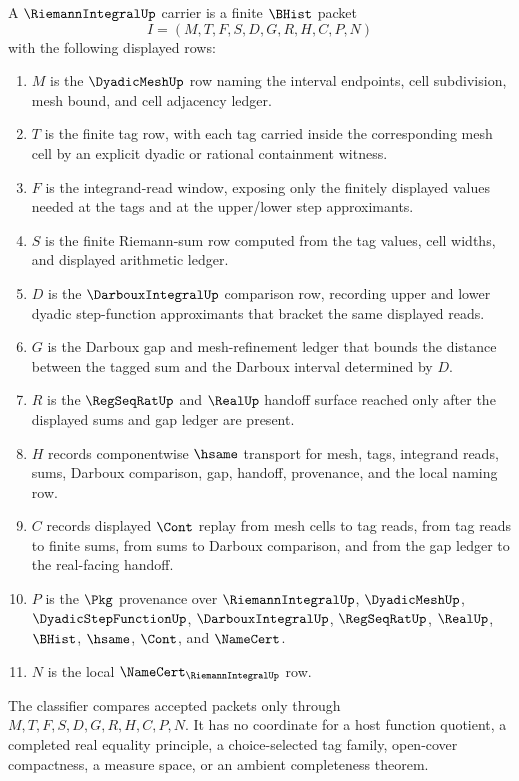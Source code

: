 \begin{definition}
\label{def:riemann-integral-carrier}
A $\RiemannIntegralUp$ carrier is a finite $\BHist$ packet
$$
I=(M,T,F,S,D,G,R,H,C,P,N)
$$
with the following displayed rows:
\begin{enumerate}
\item $M$ is the $\DyadicMeshUp$ row naming the interval endpoints, cell subdivision, mesh bound, and cell adjacency ledger.
\item $T$ is the finite tag row, with each tag carried inside the corresponding mesh cell by an explicit dyadic or rational containment witness.
\item $F$ is the integrand-read window, exposing only the finitely displayed values needed at the tags and at the upper/lower step approximants.
\item $S$ is the finite Riemann-sum row computed from the tag values, cell widths, and displayed arithmetic ledger.
\item $D$ is the $\DarbouxIntegralUp$ comparison row, recording upper and lower dyadic step-function approximants that bracket the same displayed reads.
\item $G$ is the Darboux gap and mesh-refinement ledger that bounds the distance between the tagged sum and the Darboux interval determined by $D$.
\item $R$ is the $\RegSeqRatUp$ and $\RealUp$ handoff surface reached only after the displayed sums and gap ledger are present.
\item $H$ records componentwise $\hsame$ transport for mesh, tags, integrand reads, sums, Darboux comparison, gap, handoff, provenance, and the local naming row.
\item $C$ records displayed $\Cont$ replay from mesh cells to tag reads, from tag reads to finite sums, from sums to Darboux comparison, and from the gap ledger to the real-facing handoff.
\item $P$ is the $\Pkg$ provenance over $\RiemannIntegralUp$, $\DyadicMeshUp$, $\DyadicStepFunctionUp$, $\DarbouxIntegralUp$, $\RegSeqRatUp$, $\RealUp$, $\BHist$, $\hsame$, $\Cont$, and $\NameCert$.
\item $N$ is the local $\NameCert_{\RiemannIntegralUp}$ row.
\end{enumerate}
The classifier compares accepted packets only through $M,T,F,S,D,G,R,H,C,P,N$. It has no coordinate for a host function quotient, a completed real equality principle, a choice-selected tag family, open-cover compactness, a measure space, or an ambient completeness theorem.
\end{definition}

